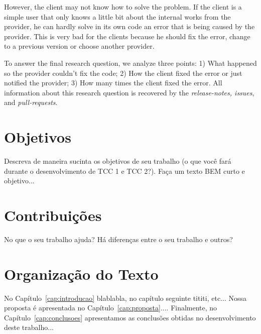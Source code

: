 However, the client may not know how to solve the problem. If the client is a simple user that only knows a little bit about the internal works from the provider, he can hardly solve in its own code an error that is being caused by the provider. This is very bad for the clients because he should fix the error, change to a previous version or choose another provider.

To answer the final research question, we analyze three points: 1) What happened so the provider couldn’t fix the code; 2) How the client fixed the error or just notified the provider; 3) How many times the client fixed the error. All information about this research question is recovered by the \textit{release-notes, issues}, and \textit{pull-requests}.

\section{Objetivos}
\label{cap:introducao:sec:objetivos}

Descreva de maneira sucinta os objetivos de seu trabalho (o que você fará durante o desenvolvimento de TCC 1 e TCC 2?). Faça um texto BEM curto e objetivo...

\section{Contribuições}
\label{cap:introducao:sec:contribuicoes}

No que o seu trabalho ajuda? Há diferenças entre o seu trabalho e outros?

\section{Organização do Texto}
\label{cap:introducao:sec:organizacao:texto}

No Capítulo~\ref{cap:introducao} blablabla, no capítulo seguinte tititi, etc... Nossa proposta é apresentada no Capítulo~\ref{cap:proposta}.... Finalmente, no Capítulo~\ref{cap:conclusoes} apresentamos as conclusões obtidas no desenvolvimento deste trabalho...